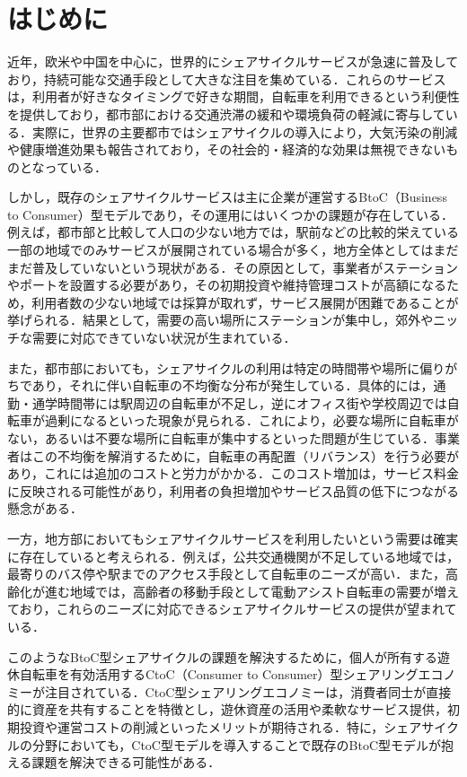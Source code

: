 \section{はじめに}
  \label{sec:はじめに}
    \par 近年，欧米や中国を中心に，世界的にシェアサイクルサービスが急速に普及しており，持続可能な交通手段として大きな注目を集めている．これらのサービスは，利用者が好きなタイミングで好きな期間，自転車を利用できるという利便性を提供しており，都市部における交通渋滞の緩和や環境負荷の軽減に寄与している．実際に，世界の主要都市ではシェアサイクルの導入により，大気汚染の削減や健康増進効果も報告されており，その社会的・経済的な効果は無視できないものとなっている．
    \par しかし，既存のシェアサイクルサービスは主に企業が運営するBtoC（Business to Consumer）型モデルであり，その運用にはいくつかの課題が存在している．例えば，都市部と比較して人口の少ない地方では，駅前などの比較的栄えている一部の地域でのみサービスが展開されている場合が多く，地方全体としてはまだまだ普及していないという現状がある．その原因として，事業者がステーションやポートを設置する必要があり，その初期投資や維持管理コストが高額になるため，利用者数の少ない地域では採算が取れず，サービス展開が困難であることが挙げられる．結果として，需要の高い場所にステーションが集中し，郊外やニッチな需要に対応できていない状況が生まれている．
     \par また，都市部においても，シェアサイクルの利用は特定の時間帯や場所に偏りがちであり，それに伴い自転車の不均衡な分布が発生している．具体的には，通勤・通学時間帯には駅周辺の自転車が不足し，逆にオフィス街や学校周辺では自転車が過剰になるといった現象が見られる．これにより，必要な場所に自転車がない，あるいは不要な場所に自転車が集中するといった問題が生じている．事業者はこの不均衡を解消するために，自転車の再配置（リバランス）を行う必要があり，これには追加のコストと労力がかかる．このコスト増加は，サービス料金に反映される可能性があり，利用者の負担増加やサービス品質の低下につながる懸念がある．
      \par 一方，地方部においてもシェアサイクルサービスを利用したいという需要は確実に存在していると考えられる．例えば，公共交通機関が不足している地域では，最寄りのバス停や駅までのアクセス手段として自転車のニーズが高い．また，高齢化が進む地域では，高齢者の移動手段として電動アシスト自転車の需要が増えており，これらのニーズに対応できるシェアサイクルサービスの提供が望まれている．
       \par このようなBtoC型シェアサイクルの課題を解決するために，個人が所有する遊休自転車を有効活用するCtoC（Consumer to Consumer）型シェアリングエコノミーが注目されている．CtoC型シェアリングエコノミーは，消費者同士が直接的に資産を共有することを特徴とし，遊休資産の活用や柔軟なサービス提供，初期投資や運営コストの削減といったメリットが期待される．特に，シェアサイクルの分野においても，CtoC型モデルを導入することで既存のBtoC型モデルが抱える課題を解決できる可能性がある．

